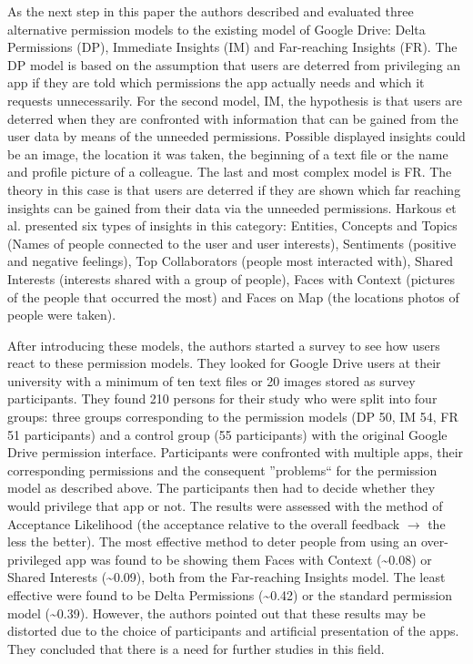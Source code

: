\documentclass[11pt,twocolumn,a4paper,DIV=calc]{scrartcl}
\begin{document}
As the next step in this paper the authors described and evaluated three alternative permission models to the existing model of Google Drive: Delta Permissions (DP), Immediate Insights (IM) and Far-reaching Insights (FR).
The DP model is based on the assumption that users are deterred from privileging an app if they are told which permissions the app actually needs and which it requests unnecessarily. 
For the second model, IM, the hypothesis is that users are deterred when they are confronted with information that can be gained from the user data by means of the unneeded permissions. 
Possible displayed insights could be an image, the location it was taken, the beginning of a text file or the name and profile picture of a colleague. 
The last and most complex model is FR. 
The theory in this case is that users are deterred if they are shown which far reaching insights can be gained from their data via the unneeded permissions. 
Harkous et al. presented six types of insights in this category: Entities, Concepts and Topics (Names of people connected to the user and user interests), Sentiments (positive and negative feelings), Top Collaborators (people most interacted with), Shared Interests (interests shared with a group of people), Faces with Context (pictures of the people that occurred the most) and Faces on Map (the locations photos of people were taken).
 
After introducing these models, the authors started a survey to see how users react to these permission models. 
They looked for Google Drive users at their university with a minimum of ten text files or 20 images stored as survey participants. 
They found 210 persons for their study who were split into four groups: three groups corresponding to the permission models (DP 50, IM 54, FR 51 participants) and a control group (55 participants) with the original Google Drive permission interface.  Participants were confronted with multiple apps, their corresponding permissions and the consequent ''problems`` for the permission model as described above. 
The participants then had to decide whether they would privilege that app or not. 
The results were assessed with the method of Acceptance Likelihood (the acceptance relative to the overall feedback $\rightarrow$ the less the better). 
The most effective method to deter people from using an over-privileged app was found to be showing them Faces with Context (\textasciitilde 0.08) or Shared Interests (\textasciitilde 0.09), both from the Far-reaching Insights model. 
The least effective were found to be Delta Permissions (\textasciitilde 0.42) or the standard permission model (\textasciitilde 0.39). 
However, the authors pointed out that these results may be distorted due to the choice of participants and artificial presentation of the apps. 
They concluded that there is a need for further studies in this field. \\
\end{document}
